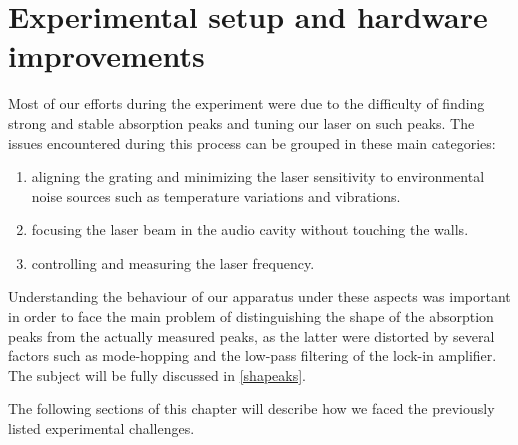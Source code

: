 \chapter{Experimental setup and hardware improvements} 
Most of our efforts during the experiment were due to the difficulty of finding strong and stable absorption peaks and tuning our laser on such peaks.
The issues encountered during this process can be grouped in these main categories:
\begin{enumerate} 
\item aligning the grating and minimizing the laser sensitivity to environmental noise sources such as temperature variations and vibrations.
\item focusing the laser beam in the audio cavity without touching the walls.
\item controlling and measuring the laser frequency.
\end{enumerate}
Understanding the behaviour of our apparatus under these aspects was important in order to face the main problem of distinguishing the shape of the absorption peaks from the actually measured peaks, as the latter were distorted by several factors such as mode-hopping and the low-pass filtering of the lock-in amplifier. The subject will be fully discussed in \cref{shapeaks}.

\medskip
The following sections of this chapter will describe how we faced the previously listed experimental challenges.

